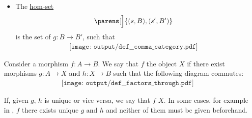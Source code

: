 \begin{definition}
\begin{thmenum}
\begin{minipage}[t]{0.43\textwidth}
\begin{itemize}
        \item The \hyperref[def:category/morphisms]{hom-set}
        \begin{equation*}
          [X \downarrow G]\parens[\Big]{ (s, B), (s', B') }
        \end{equation*}
        is the set of \( g: B \to B' \), such that
        \begin{equation}\label{eq:def:comma_category/fixed/left}
          \begin{aligned}
            \texttt{[image: output/def\_\_comma\_category.pdf]}
          \end{aligned}
        \end{equation}
      \end{itemize}
    \end{minipage}
  \end{thmenum}
\end{definition}

\begin{definition}\label{def:factors_through}
  Consider a morphism \( f: A \to B \). We say that \( f \)  the object \( X \) if there exist morphisms \( g: A \to X \) and \( h: X \to B \) such that the following diagram commutes:
  \begin{equation}\label{eq:def:factors_through}
    \begin{aligned}
      \texttt{[image: output/def\_\_factors\_through.pdf]}
    \end{aligned}
  \end{equation}

  If, given \( g \), \( h \) is unique or vice versa, we say that \( f \)  \( X \). In some cases, for example in , \( f \) there exists unique \( g \) and \( h \) and neither of them must be given beforehand.
\end{definition}

